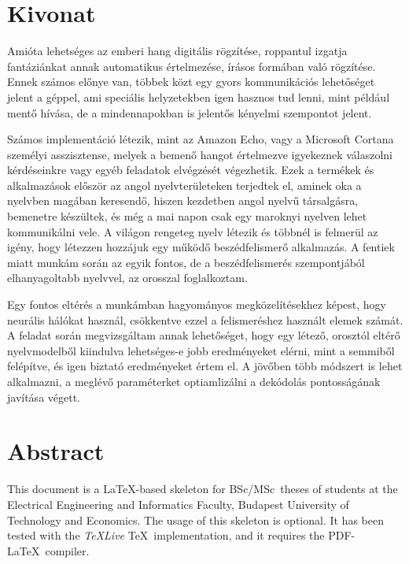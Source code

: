 \setcounter{page}{1}

\selecthungarian

\chapter*{Kivonat}

Amióta lehetséges az emberi hang digitális rögzítése, roppantul izgatja fantáziánkat annak automatikus értelmezése, írásos formában való rögzítése. Ennek számos előnye van, többek közt egy gyors kommunikációs lehetőséget jelent a géppel, ami speciális helyzetekben igen hasznos tud lenni, mint például mentő hívása, de a mindennapokban is jelentős kényelmi szempontot jelent.

Számos implementáció létezik, mint az Amazon Echo, vagy a Microsoft Cortana személyi asszisztense, melyek a bemenő hangot értelmezve igyekeznek válaszolni kérdéseinkre vagy egyéb feladatok elvégzését végezhetik. Ezek a termékek és alkalmazások először az angol nyelvterületeken terjedtek el, aminek oka a nyelvben magában keresendő, hiszen kezdetben angol nyelvű társalgásra, bemenetre készültek, és még a mai napon csak egy maroknyi nyelven lehet kommunikálni vele. A világon rengeteg nyelv létezik és többnél is felmerül az igény, hogy létezzen hozzájuk egy működő beszédfelismerő alkalmazás. A fentiek miatt munkám során az egyik fontos, de a beszédfelismerés szempontjából elhanyagoltabb nyelvvel, az orosszal foglalkoztam. 

Egy fontos eltérés a munkámban hagyományos megközelítésekhez képest, hogy neurális hálókat használ, csökkentve ezzel a felismeréshez használt elemek számát. A feladat során megvizsgáltam annak lehetőséget, hogy egy létező, orosztól eltérő nyelvmodelből kiindulva lehetséges-e jobb eredményeket elérni, mint a semmiből felépítve, és igen biztató eredményeket értem el. A jövőben több módszert is lehet alkalmazni, a meglévő paraméterket optiamlizálni a dekódolás pontosságának javítása végett.

\vfill
\selectenglish


\chapter*{Abstract}

This document is a \LaTeX-based skeleton for BSc/MSc~theses of students at the Electrical Engineering and Informatics Faculty, Budapest University of Technology and Economics. The usage of this skeleton is optional. It has been tested with the \emph{TeXLive} \TeX~implementation, and it requires the PDF-\LaTeX~compiler.


\vfill
\selectthesislanguage

\setcounter{romanPage}{\value{page}}
